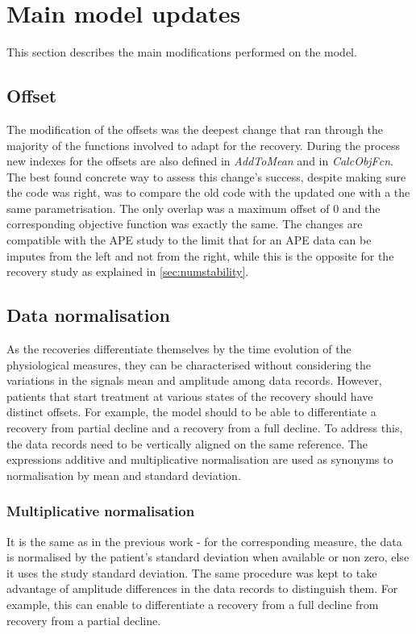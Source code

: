 \section{Main model updates}
This section describes the main modifications performed on the model.

\subsection{Offset}
The modification of the offsets was the deepest change that ran through the majority of the functions involved to adapt for the recovery. During the process new indexes for the offsets are also defined in \textit{AddToMean} and in \textit{CalcObjFcn}. The best found concrete way to assess this change's success, despite making sure the code was right, was to compare the old code with the updated one with a the same parametrisation. The only overlap was a maximum offset of 0 and the corresponding objective function was exactly the same. The changes are compatible with the APE study to the limit that for an APE data can be imputes from the left and not from the right, while this is the opposite for the recovery study as explained in \ref{sec:numstability}.

\subsection{Data normalisation} \label{sec:normalisation}
As the recoveries differentiate themselves by the time evolution of the physiological measures, they can be characterised without considering the variations in the signals mean and amplitude among data records. However, patients that start treatment at various states of the recovery should have distinct offsets. For example, the model should to be able to differentiate a recovery from partial decline and a recovery from a full decline. To address this, the data records need to be vertically aligned on the same reference. The expressions additive and multiplicative normalisation are used as synonyms to normalisation by mean and standard deviation. 

\subsubsection{Multiplicative normalisation}
It is the same as in the previous work - for the corresponding measure, the data is normalised by the patient's standard deviation when available or non zero, else it uses the study standard deviation. The same procedure was kept to take advantage of amplitude differences in the data records to distinguish them. For example, this can enable to differentiate a recovery from a full decline from recovery from a partial decline.

